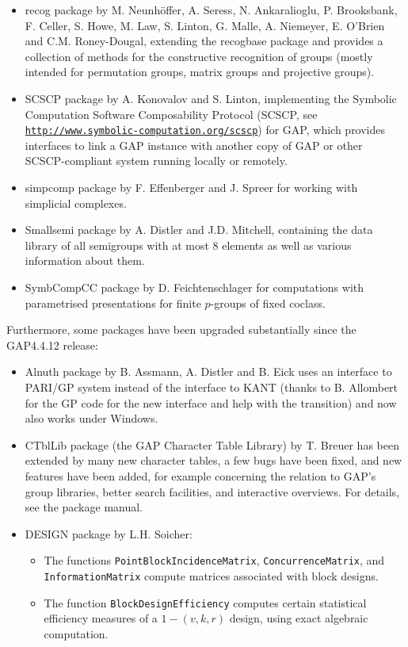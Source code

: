 \documentclass[a4paper,11pt]{report}
\begin{document}
{{{\begin{itemize}
group recognition methods in a generic way (suitable, in particular, for
permutation groups, matrix groups, projective groups and black box groups). 
\item  \textsf{recog} package by M. Neunh{\"o}ffer, A. Seress, N. Ankaralioglu, P. Brooksbank, F.
Celler, S. Howe, M. Law, S. Linton, G. Malle, A. Niemeyer, E. O'Brien and C.M.
Roney-Dougal, extending the \textsf{recogbase} package and provides a collection of methods for the constructive recognition
of groups (mostly intended for permutation groups, matrix groups and
projective groups). 
\item  \textsf{SCSCP} package by A. Konovalov and S. Linton, implementing the Symbolic Computation
Software Composability Protocol (\textsf{SCSCP}, see \href{http://www.symbolic-computation.org/scscp} {\texttt{http://www.symbolic-computation.org/scscp}}) for \textsf{GAP}, which provides interfaces to link a \textsf{GAP} instance with another copy of \textsf{GAP} or other \textsf{SCSCP}-compliant system running locally or remotely. 
\item  \textsf{simpcomp} package by F. Effenberger and J. Spreer for working with simplicial complexes. 
\item  \textsf{Smallsemi} package by A. Distler and J.D. Mitchell, containing the data library of all
semigroups with at most 8 elements as well as various information about them. 
\item  \textsf{SymbCompCC} package by D. Feichtenschlager for computations with parametrised
presentations for finite $p$-groups of fixed coclass. 
\end{itemize}
 Furthermore, some packages have been upgraded substantially since the \textsf{GAP}{\nobreakspace}4.4.12 release: 
\begin{itemize}
\item  \textsf{Alnuth} package by B. Assmann, A. Distler and B. Eick uses an interface to PARI/GP
system instead of the interface to KANT (thanks to B. Allombert for the GP
code for the new interface and help with the transition) and now also works
under Windows. 
\item  \textsf{CTblLib} package (the \textsf{GAP} Character Table Library) by T. Breuer has been extended by many new character
tables, a few bugs have been fixed, and new features have been added, for
example concerning the relation to \textsf{GAP}'s group libraries, better search facilities, and interactive overviews. For
details, see the package manual. 
\item  \textsf{DESIGN} package by L.H. Soicher: 
\begin{itemize}
\item  The functions \texttt{PointBlockIncidenceMatrix}, \texttt{ConcurrenceMatrix}, and \texttt{InformationMatrix} compute matrices associated with block designs. 
\item  The function \texttt{BlockDesignEfficiency} computes certain statistical efficiency measures of a $1-(v,k,r)$ design, using exact algebraic computation. 
\end{itemize}
 

\end{itemize}}}}
\end{document}
